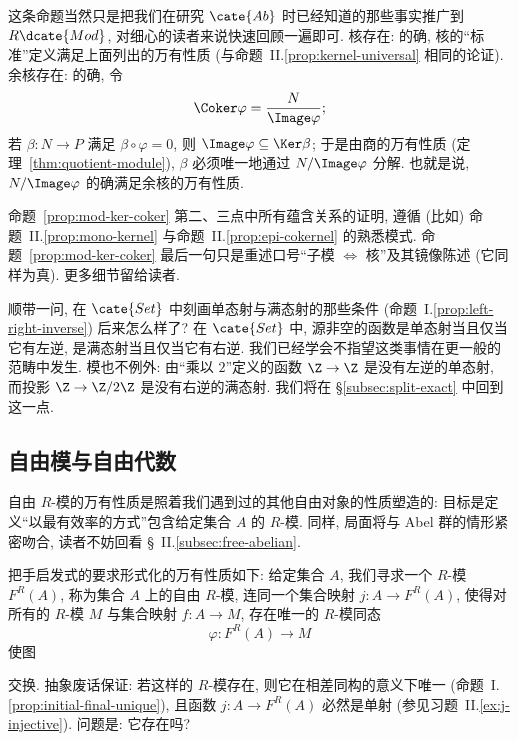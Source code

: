 这条命题当然只是把我们在研究 $\cate{Ab}$ 时已经知道的那些事实推广到 $R\dcate{Mod}$, 对细心的读者来说快速回顾一遍即可. 核存在: 的确, 核的``标准''定义满足上面列出的万有性质 (与命题~II.\ref{prop:kernel-universal} 相同的论证). 余核存在: 的确, 令
\[
\Coker \varphi = \frac{N}{\Image \varphi};
\]
若 $\beta : N \to P$ 满足 $\beta \circ \varphi = 0$, 则 $\Image \varphi \subseteq \Ker \beta$; 于是由商的万有性质 (定理~\ref{thm:quotient-module}), $\beta$ 必须唯一地通过 $N/\Image \varphi$ 分解. 也就是说, $N/\Image \varphi$ 的确满足余核的万有性质.

命题~\ref{prop:mod-ker-coker} 第二、三点中所有蕴含关系的证明, 遵循 (比如) 命题~II.\ref{prop:mono-kernel} 与命题~II.\ref{prop:epi-cokernel} 的熟悉模式. 命题~\ref{prop:mod-ker-coker} 最后一句只是重述口号``子模 $\iff$ 核''及其镜像陈述 (它同样为真). 更多细节留给读者.

顺带一问, 在 $\cate{Set}$ 中刻画单态射与满态射的那些条件 (命题~I.\ref{prop:left-right-inverse}) 后来怎么样了? 在 $\cate{Set}$ 中, 源非空的函数是单态射当且仅当它有左逆, 是满态射当且仅当它有右逆. 我们已经学会不指望这类事情在更一般的范畴中发生. 模也不例外: 由``乘以 $2$''定义的函数 $\Z \rightarrow \Z$ 是没有左逆的单态射, 而投影 $\Z \rightarrow \Z/2\Z$ 是没有右逆的满态射. 我们将在 \S\ref{subsec:split-exact} 中回到这一点.

\subsection{自由模与自由代数}
\label{subsec:free-modules}

自由 $R$-模的万有性质是照着我们遇到过的其他自由对象的性质塑造的: 目标是定义``以最有效率的方式''包含给定集合 $A$ 的 $R$-模. 同样, 局面将与 Abel 群的情形紧密吻合, 读者不妨回看 \S~II.\ref{subsec:free-abelian}.

把手启发式的要求形式化的万有性质如下: 给定集合 $A$, 我们寻求一个 $R$-模 $F^R(A)$, 称为集合 $A$ 上的自由 $R$-模, 连同一个集合映射 $j : A \to F^R(A)$, 使得对所有的 $R$-模 $M$ 与集合映射 $f : A \to M$, 存在唯一的 $R$-模同态
\[
\varphi : F^R(A) \to M
\]
使图
\begin{center}
\end{center}
交换. 抽象废话保证: 若这样的 $R$-模存在, 则它在相差同构的意义下唯一 (命题~I.\ref{prop:initial-final-unique}), 且函数 $j : A \to F^R(A)$ 必然是单射 (参见习题~II.\ref{ex:j-injective}). 问题是: 它存在吗?

